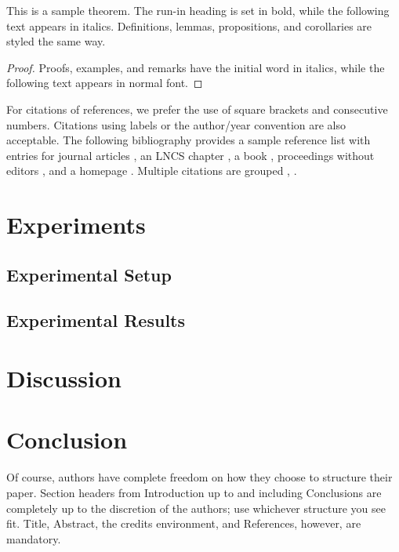 \documentclass[runningheads]{llncs}
\begin{document}
\begin{theorem}
This is a sample theorem. The run-in heading is set in bold, while
the following text appears in italics. Definitions, lemmas,
propositions, and corollaries are styled the same way.
\end{theorem}

\begin{proof}
Proofs, examples, and remarks have the initial word in italics,
while the following text appears in normal font.
\end{proof}

For citations of references, we prefer the use of square brackets and
consecutive numbers. Citations using labels or the author/year
convention are also acceptable. The following bibliography provides a
sample reference list with entries for journal articles
\citep{ref_article1}, an LNCS chapter \citep{ref_lncs1}, a book
\citep{ref_book1}, proceedings without editors \citep{ref_proc1}, and a
homepage \citep{ref_url1}. Multiple citations are grouped
\citep{ref_article1, ref_lncs1, ref_book1},
\citep{ref_article1, ref_book1, ref_proc1, ref_url1}.

\section{Experiments}\label{experiments}

\subsection{Experimental Setup}\label{experimental-setup}

\subsection{Experimental Results}\label{experimental-results}

\section{Discussion}\label{discussion}

\section{Conclusion}\label{conclusion}

Of course, authors have complete freedom on how they choose to structure
their paper. Section headers from Introduction up to and including
Conclusions are completely up to the discretion of the authors; use
whichever structure you see fit. Title, Abstract, the credits
environment, and References, however, are mandatory.
\end{document}

